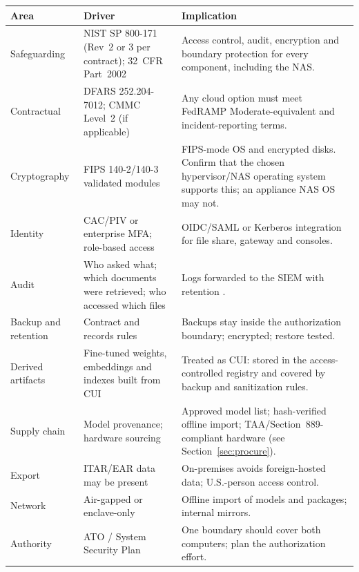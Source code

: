 
{\footnotesize
\begin{xltabular}{\textwidth}{@{}l Y{0.88} Y{1.12}@{}}
  \toprule
  Area & Driver & Implication \\
  \midrule
  \endhead
  Safeguarding & NIST SP 800-171 (Rev~2 or 3 per contract); 32~CFR Part~2002 & Access control, audit, encryption and boundary protection for every component, including the NAS. \\
  Contractual & DFARS 252.204-7012; CMMC Level~2 (if applicable) & Any cloud option must meet FedRAMP Moderate-equivalent and incident-reporting terms. \\
  Cryptography & FIPS 140-2/140-3 validated modules & FIPS-mode OS and encrypted disks. Confirm that the chosen hypervisor/NAS operating system supports this; an appliance NAS OS may not. \\
  Identity & CAC/PIV or enterprise MFA; role-based access & OIDC/SAML or Kerberos integration for file share, gateway and consoles. \\
  Audit & Who asked what; which documents were retrieved; who accessed which files & Logs forwarded to the SIEM with retention . \\
  Backup and retention & Contract and records rules & Backups stay inside the authorization boundary; encrypted; restore tested. \\
  Derived artifacts & Fine-tuned weights, embeddings and indexes built from CUI & Treated as CUI: stored in the access-controlled registry and covered by backup and sanitization rules. \\
  Supply chain & Model provenance; hardware sourcing & Approved model list; hash-verified offline import; TAA/Section~889-compliant hardware (see Section~\ref{sec:procure}). \\
  Export & ITAR/EAR data may be present & On-premises avoids foreign-hosted data; U.S.-person access control. \\
  Network & Air-gapped or enclave-only & Offline import of models and packages; internal mirrors. \\
  Authority & ATO / System Security Plan & One boundary should cover both computers; plan the authorization effort. \\
  \bottomrule
\end{xltabular}}

